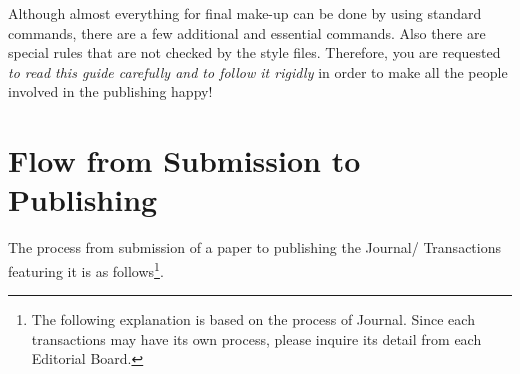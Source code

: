 \documentclass[english]{ipsjpapers}
\def\LaTeX{\leavevmode\smash{\iLATEX{\sc a}}}
\def\iLATEX#1{L\kern-.36em\raise.3ex\hbox{#1}\kern-.15em
    T\kern-.1667em\lower.7ex\hbox{E}\kern-.125emX}
\begin{document}
Although almost everything for final make-up can be done by using standard
{\LaTeX} commands, there are a few additional and essential commands.  Also
there are special rules that are not checked by the style files.  Therefore,
you are requested {\em to read this guide carefully and to follow it
rigidly} in order to make all the people involved in the publishing happy!


\section{Flow from Submission to Publishing}
\label{sec:Enum}\label{sec:enum}

The process from submission of a paper to publishing the Journal\slash
Transactions featuring it is as follows\footnote[2]{%
%
The following explanation is based on the process of Journal.  Since each
transactions may have its own process, please inquire its detail from each
Editorial Board.}.
%
\end{document}
